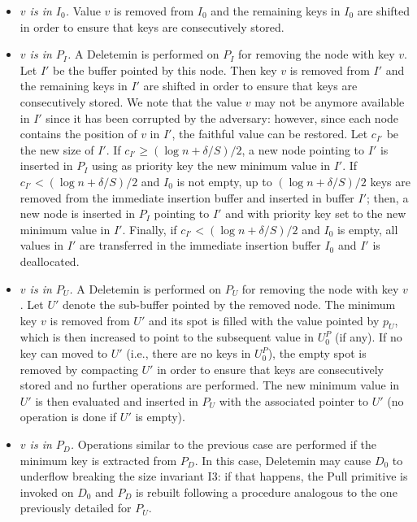\documentclass[review,number]{elsarticle}
\newcommand{\Deletemin}{\textsf{Deletemin}}
\newcommand{\Pull}{\textsf{Pull}}
\begin{document}
\begin{itemize}
 \item \emph{$v$ is in $I_{0}$.} Value $v$ is removed
from $I_0$ and the remaining keys in $I_0$ are shifted in order to 
ensure that keys are consecutively stored.

\item \emph{$v$ is in  $P_{I}$.}  A \Deletemin{} is performed on $P_I$ for
removing the node with key $v$. Let $I'$ be the buffer pointed by this node.
Then key $v$ is removed from $I'$ and the remaining keys in $I'$ are shifted in
order to ensure that keys are consecutively stored. We note that the value $v$
may not be  anymore available in $I'$ since it has been corrupted by the
adversary: however, since each node contains the position of $v$ in $I'$, the
faithful value can be restored. Let $c_{I'}$ be the new size of $I'$.  If
$c_{I'} \geq (\log n + \delta / S)/2$, a new node pointing to $I'$ is inserted
in $P_I$ using as priority key the new minimum value in $I'$. If $c_{I'} < (\log
n + \delta / S)/2$ and $I_{0}$ is not empty, up to $(\log n + \delta / S)/2$
keys are removed from the immediate insertion buffer and inserted in buffer
$I'$; then, a new node is inserted in $P_I$ pointing to $I'$ and with priority
key set to the new minimum value in $I'$. Finally, if $c_{I'} < (\log n + \delta
/ S)/2$ and $I_{0}$ is empty, all values in $I'$ are transferred in the
immediate insertion buffer $I_0$ and $I'$ is deallocated.

\item \emph{$v$ is in  $P_{U}$.} A \Deletemin{} is performed on $P_{U}$ for
removing the node with key $v$. Let $U'$ denote the sub-buffer  pointed by the
removed node. The minimum key $v$ is removed from $U'$ and its spot is filled
with the value pointed by  $p_{U}$, which is then increased to point to the
subsequent value in $U^P_0$ (if any). If no key can moved to $U'$ (i.e., there
are no keys in $U_0^P$), the empty spot is removed by compacting $U'$ in
order to ensure that keys are consecutively stored and no further operations are
performed. The new minimum value in $U'$ is then evaluated and inserted in
$P_{U}$ with the associated pointer to $U'$ (no operation is done if $U'$ is
empty). 

\item \emph{$v$ is in  $P_{D}$.} 
Operations similar to the previous case are performed if the minimum key
is extracted from $P_{D}$. In this case, \Deletemin{} may cause $D_{0}$ to
underflow breaking the
size invariant I3: if that happens, the \Pull{} primitive is invoked on $D_{0}$
and $P_{D}$ is rebuilt following a procedure analogous to the one previously
detailed for $P_U$. 
\end{itemize}
\end{document}
